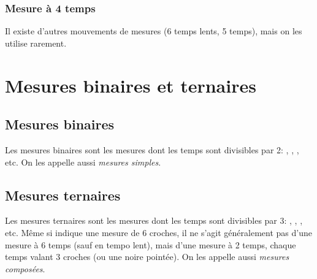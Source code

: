 \subsubsection{Mesure à 4 temps}

Il existe d'autres mouvements de mesures (6 temps lents, 5 temps), mais on les utilise rarement.

\section{Mesures binaires et ternaires}
\subsection{Mesures binaires}
Les mesures binaires sont les mesures dont les temps sont divisibles par 2: , , , etc. On les appelle aussi \emph{mesures simples}.

\subsection{Mesures ternaires}
Les mesures ternaires sont les mesures dont les temps sont divisibles par 3: , , , etc. Même si  indique une mesure de 6 croches, il ne s'agit généralement pas d'une mesure à 6 temps (sauf en tempo lent), mais d'une mesure à 2 temps, chaque temps valant 3 croches (ou une noire pointée). On les appelle aussi \emph{mesures composées}.




